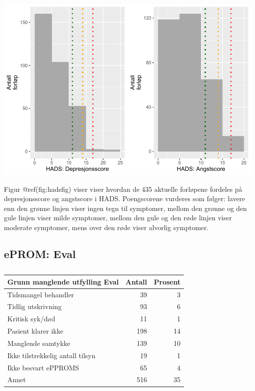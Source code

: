 \documentclass[
]{article}
\begin{document}
\includegraphics{lokalEpromNy_files/figure-latex/hadsfig-1.pdf}

Figur @ref(fig:hadsfig) viser viser hvordan de 435 aktuelle forløpene
fordeles på depresjonsscore og angstscore i HADS. Poengscorene vurderes
som følger: lavere enn den grønne linjen viser ingen tegn til symptomer,
mellom den grønne og den gule linjen viser milde symptomer, mellom den
gule og den røde linjen viser moderate symptomer, mens over den røde
viser alvorlig symptomer.

\hypertarget{eprom-eval}{%
\subsection{ePROM: Eval}\label{eprom-eval}}

\begin{table}

\caption{\label{tab:evalspmtab}}
\centering
\begin{tabular}[t]{l|r|r}
\hline
Grunn manglende utfylling Eval & Antall  & Prosent\\
\hline
Tidsmangel behandler & 39 & 3\\
\hline
Tidlig utskrivning & 93 & 6\\
\hline
Kritisk syk/død & 11 & 1\\
\hline
Pasient klarer ikke & 198 & 14\\
\hline
Manglende samtykke & 139 & 10\\
\hline
Ikke tilstrekkelig antall tilsyn & 19 & 1\\
\hline
Ikke besvart ePPROMS & 65 & 4\\
\hline
Annet & 516 & 35\\
\hline
\end{tabular}
\end{table}
\end{document}
